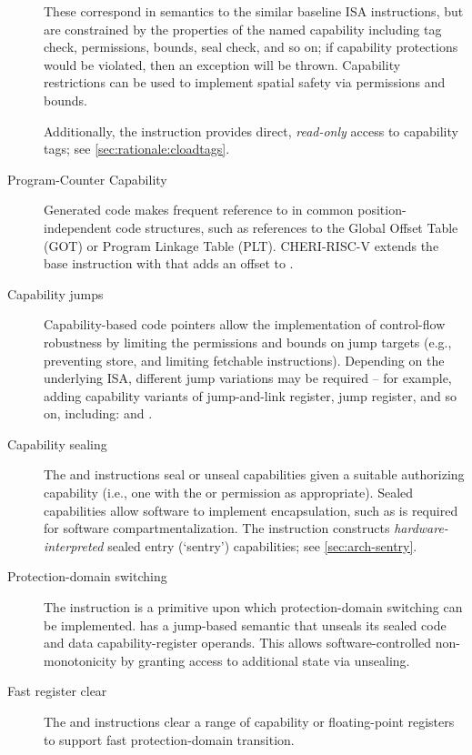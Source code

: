 \begin{description}
These correspond in semantics to the similar baseline ISA instructions, but
are constrained by the properties of the named capability including tag check,
permissions, bounds, seal check, and so on; if capability protections would be
violated, then an exception will be thrown.
Capability restrictions can be used to implement spatial safety via
permissions and bounds.

Additionally, the  instruction provides direct,
\emph{read-only} access to capability tags; see
\cref{sec:rationale:cloadtags}.

\item[Program-Counter Capability]
Generated code makes frequent reference to \PCC{} in common position-independent
code structures, such as references to the Global Offset Table (GOT) or
Program Linkage Table (PLT).
CHERI-RISC-V extends the base  instruction with
 that adds an offset to \PCC{}.

\item[Capability jumps]
Capability-based code pointers allow the implementation of control-flow
robustness by limiting the permissions and bounds on jump targets (e.g.,
preventing store, and limiting fetchable instructions).
Depending on the underlying ISA, different jump variations may be required --
for example, adding capability variants of jump-and-link register, jump
register, and so on, including:  and .

\item[Capability sealing]
The  and  instructions seal or
unseal capabilities given a suitable authorizing capability (i.e., one with
the \cappermSeal or \cappermUnseal permission as appropriate).
Sealed capabilities allow software to implement encapsulation, such as is
required for software compartmentalization.  The 
instruction constructs \emph{hardware-interpreted} sealed entry (`sentry')
capabilities; see \cref{sec:arch-sentry}.

\item[Protection-domain switching]
The  instruction is a
primitive upon which protection-domain switching can be implemented.
 has a jump-based semantic that
unseals its sealed code and data capability-register operands.
This allows software-controlled non-monotonicity by granting
access to additional state via unsealing.

\item[Fast register clear]
The  and  instructions clear a range of capability
or floating-point registers to support fast protection-domain
transition.


\end{description}
